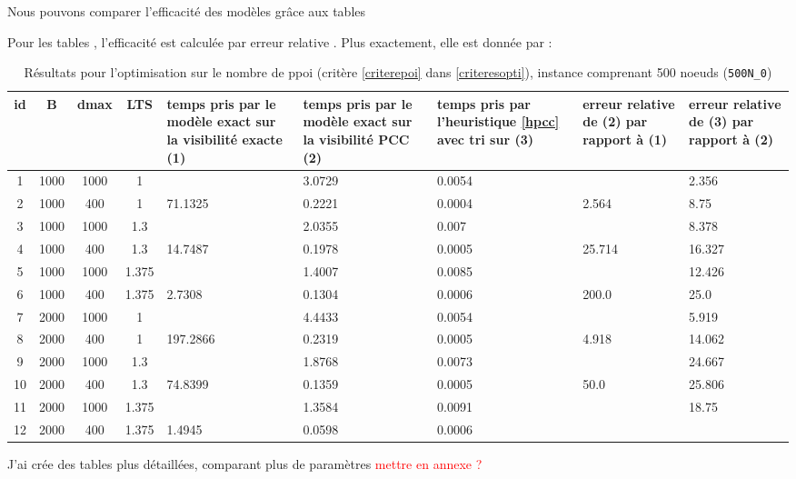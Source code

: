 Nous pouvons comparer l'efficacité des modèles grâce aux tables 

Pour les tables , l'efficacité est calculée par erreur relative \cite{erreur_relative}. Plus exactement, elle est donnée par :



\begin{table}[H]
\centering
\caption{Résultats pour l'optimisation sur le nombre de ppoi (critère \ref{criterepoi} dans \ref{criteresopti}), instance comprenant 500 noeuds (\texttt{500N\_0})}
\label{tab:res500}
\vspace{0.5cm}
\begin{tabular}{|c|c|c|c|p{2cm}|p{2cm}|p{2cm}|p{2cm}|p{2cm}|}
\hline
id & B & dmax & LTS & temps pris par
le modèle exact sur la visibilité exacte (1) & temps pris par le modèle exact sur la visibilité PCC (2) & temps pris par
l'heuristique \ref{hpcc} avec tri sur (3) & erreur relative de
(2) par rapport à (1) & erreur relative de
(3) par rapport à (2) \\
\hline
1 & 1000 & 1000 & 1 &  & 3.0729 & 0.0054 &  & 2.356 \\
2 & 1000 & 400 & 1 & 71.1325 & 0.2221 & 0.0004 & 2.564 & 8.75 \\
3 & 1000 & 1000 & 1.3 &  & 2.0355 & 0.007 &  & 8.378 \\
4 & 1000 & 400 & 1.3 & 14.7487 & 0.1978 & 0.0005 & 25.714 & 16.327 \\
5 & 1000 & 1000 & 1.375 &  & 1.4007 & 0.0085 &  & 12.426 \\
6 & 1000 & 400 & 1.375 & 2.7308 & 0.1304 & 0.0006 & 200.0 & 25.0 \\
7 & 2000 & 1000 & 1 &  & 4.4433 & 0.0054 &  & 5.919 \\
8 & 2000 & 400 & 1 & 197.2866 & 0.2319 & 0.0005 & 4.918 & 14.062 \\
9 & 2000 & 1000 & 1.3 &  & 1.8768 & 0.0073 &  & 24.667 \\
10 & 2000 & 400 & 1.3 & 74.8399 & 0.1359 & 0.0005 & 50.0 & 25.806 \\
11 & 2000 & 1000 & 1.375 &  & 1.3584 & 0.0091 &  & 18.75 \\
12 & 2000 & 400 & 1.375 & 1.4945 & 0.0598 & 0.0006 &  &  \\
\hline
\end{tabular}
\end{table}

J'ai crée des tables plus détaillées, comparant plus de paramètres \textcolor{red}{mettre en annexe ?}



